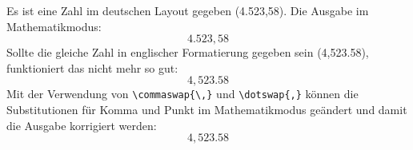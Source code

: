\documentclass[ngerman]{tudscrreprt}
\begin{document}
\pagestyle{empty}\noindent
Es ist eine Zahl im deutschen Layout gegeben (4.523,58). Die Ausgabe im 
Mathematikmodus:
\[4.523,58\]
Sollte die gleiche Zahl in englischer Formatierung gegeben sein (4,523.58), 
funktioniert das nicht mehr so gut:
\[4,523.58\]
Mit der Verwendung von \verb|\commaswap{\,}| und \verb|\dotswap{,}| können die 
Substitutionen für Komma und Punkt im Mathematikmodus geändert und damit die 
Ausgabe korrigiert werden:
\begingroup
\commaswap{\,}
\dotswap{,}
\[4,523.58\]
\endgroup
\end{document}
